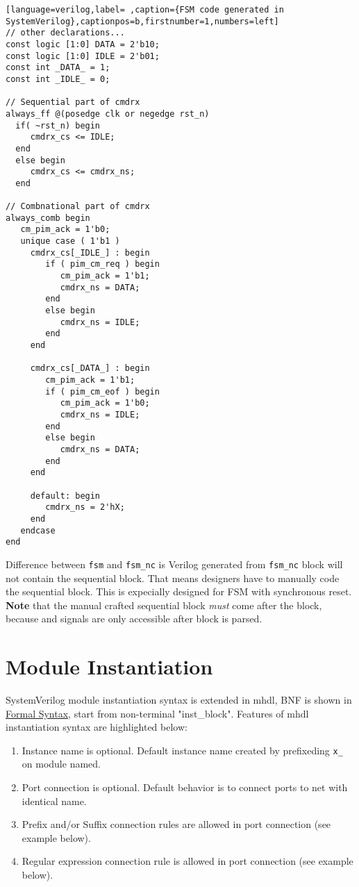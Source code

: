 \documentclass[10pt,oneside]{book}
\begin{document}
\begin{lstlisting}[language=verilog,label= ,caption={FSM code generated in SystemVerilog},captionpos=b,firstnumber=1,numbers=left]
// other declarations...
const logic [1:0] DATA = 2'b10; 
const logic [1:0] IDLE = 2'b01; 
const int _DATA_ = 1; 
const int _IDLE_ = 0;

// Sequential part of cmdrx
always_ff @(posedge clk or negedge rst_n) 
  if( ~rst_n) begin
     cmdrx_cs <= IDLE; 
  end 
  else begin
     cmdrx_cs <= cmdrx_ns;
  end

// Combnational part of cmdrx 
always_comb begin 
   cm_pim_ack = 1'b0;
   unique case ( 1'b1 ) 
     cmdrx_cs[_IDLE_] : begin 
        if ( pim_cm_req ) begin
           cm_pim_ack = 1'b1; 
           cmdrx_ns = DATA; 
        end
        else begin
           cmdrx_ns = IDLE; 
        end
     end

     cmdrx_cs[_DATA_] : begin
        cm_pim_ack = 1'b1; 
        if ( pim_cm_eof ) begin
           cm_pim_ack = 1'b0; 
           cmdrx_ns = IDLE; 
        end
        else begin
           cmdrx_ns = DATA; 
        end
     end

     default: begin 
        cmdrx_ns = 2'hX; 
     end 
   endcase
end
\end{lstlisting}

Difference between \texttt{fsm} and \texttt{fsm\_nc} is Verilog generated from
\texttt{fsm\_nc} block will not contain the sequential block.  That means
designers have to manually code the sequential block.  This is
expecially designed for FSM with synchronous reset.  \textbf{Note} that the
manual crafted sequential block \emph{must} come after the block, because
and signals are only accessible after block is parsed.

\section{Module Instantiation}
\label{sec:org2674b28}
SystemVerilog module instantiation syntax is extended in mhdl, BNF is
shown in \hyperref[sec:orgbcbe461]{Formal Syntax}, start from non-terminal "inst\_block". Features
of mhdl instantiation syntax are highlighted below:

\begin{enumerate}
\item Instance name is optional.  Default instance name created by
prefixeding \texttt{x\_} on module named.
\item Port connection is optional.  Default behavior is to connect ports to
net with identical name.
\item Prefix and/or Suffix connection rules are allowed in port
connection (see example below).
\item Regular expression connection rule is allowed in port connection
(see example below).
\end{enumerate}
\end{document}
